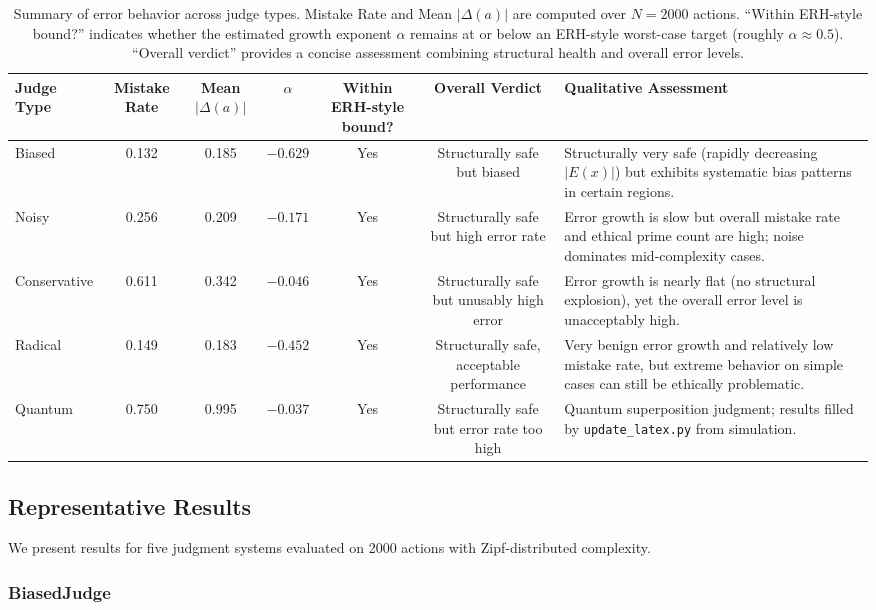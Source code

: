 \documentclass[12pt,a4paper]{article}
\theoremstyle{definition}
\theoremstyle{remark}
\begin{document}
\begin{table}[htbp]
\centering
\caption{Summary of error behavior across judge types. Mistake Rate and Mean $|\Delta(a)|$ are computed over $N = 2000$ actions. ``Within ERH-style bound?'' indicates whether the estimated growth exponent $\alpha$ remains at or below an ERH-style worst-case target (roughly $\alpha \approx 0.5$). ``Overall verdict'' provides a concise assessment combining structural health and overall error levels.}
\label{tab:summary_judges}
\begin{tabular}{lcccccp{5cm}}
\toprule
\textbf{Judge Type} & \textbf{Mistake Rate} & \textbf{Mean $|\Delta(a)|$} & \textbf{$\alpha$} & \textbf{Within ERH-style bound?} & \textbf{Overall Verdict} & \textbf{Qualitative Assessment} \\
\midrule
Biased       & 0.132 & 0.185 & $-0.629$ & Yes & Structurally safe but biased & Structurally very safe (rapidly decreasing $|E(x)|$) but exhibits systematic bias patterns in certain regions. \\
Noisy        & 0.256 & 0.209 & $-0.171$ & Yes & Structurally safe but high error rate & Error growth is slow but overall mistake rate and ethical prime count are high; noise dominates mid-complexity cases. \\
Conservative & 0.611 & 0.342 & $-0.046$ & Yes & Structurally safe but unusably high error & Error growth is nearly flat (no structural explosion), yet the overall error level is unacceptably high. \\
Radical      & 0.149 & 0.183 & $-0.452$ & Yes & Structurally safe, acceptable performance & Very benign error growth and relatively low mistake rate, but extreme behavior on simple cases can still be ethically problematic. \\
Quantum      & 0.750 & 0.995 & $-0.037$ & Yes & Structurally safe but error rate too high & Quantum superposition judgment; results filled by \texttt{update\_latex.py} from simulation. \\
\bottomrule
\end{tabular}
\end{table}

\subsection{Representative Results}

We present results for five judgment systems evaluated on 2000 actions with Zipf-distributed complexity.

\subsubsection{BiasedJudge}
\end{document}
